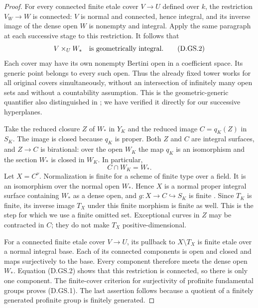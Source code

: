 \begin{proof}
For every connected finite etale cover $V\to U$ defined over $k$, the
restriction $V_W\to W$ is connected: $V$ is normal and connected, hence
integral, and its inverse image of the dense open $W$ is nonempty and
integral. Apply the same paragraph at each successive stage to this
restriction. It follows that
\[
             V\times_U W_*\quad\hbox{is geometrically integral.}
             \tag{D.GS.2}
\]
Each cover may have its own nonempty Bertini open in a coefficient
space. Its generic point belongs to every such open. Thus the already
fixed tower works for all original covers simultaneously, without an
intersection of infinitely many open sets and without a countability
assumption. This is the geometric-generic quantifier also distinguished
in \citet[Remark 1.5 and Corollary 2.3, pp.~2 and 5--6]{Landesman2020D};
we have verified it directly for our successive hyperplanes.

Take the reduced closure $Z$ of $W_*$ in $Y_K$ and the reduced image
$C=q_K(Z)$ in $S_K$. The image is closed because $q_K$ is proper.
Both $Z$ and $C$ are integral surfaces, and $Z\to C$ is birational:
over the open $W_K$ the map $q_K$ is an isomorphism and the section
$W_*$ is closed in $W_K$. In particular,
\[
                        C\cap W_K=W_*.
\]
Let $X=C^\nu$. Normalization is finite for a scheme of finite type over
a field. It is an isomorphism over the normal open $W_*$. Hence $X$ is
a normal proper integral surface containing $W_*$ as a dense open,
and $g:X\to C\hookrightarrow S_K$ is finite
\citep[Tag 035E, Lemmas 29.55.8--11]{StacksDGenericSurface}.
Since $T_K$ is finite, its inverse image $T_X$ under this finite
morphism is finite as well. This is the step for which we use a finite
omitted set. Exceptional curves in $Z$ may be contracted in $C$; they
do not make $T_X$ positive-dimensional.

For a connected finite etale cover $V\to U$, its pullback to
$X\setminus T_X$ is finite etale over a normal integral base. Each of
its connected components is open and closed and maps surjectively to
the base. Every component therefore meets the dense open $W_*$.
Equation (D.GS.2) shows that this restriction is connected, so there is
only one component. The finite-cover criterion for surjectivity of
profinite fundamental groups proves (D.GS.1). The last assertion follows
because a quotient of a finitely generated profinite group is finitely
generated.
\end{proof}


